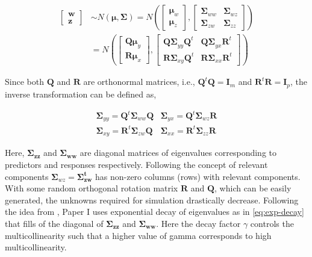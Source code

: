 \documentclass[11pt,twoside,openright,titlepage,
  headinclude,footinclude,BCOR=5mm,
  numbers=noenddot,cleardoublepage=empty,
  tablecaptionabove, dottedtoc,
  bibliography=totoc,paper=a4]{scrreprt}
\begin{document}
\begin{align}
  \begin{bmatrix}\mathbf{w} \\
  \mathbf{z}\end{bmatrix}  & \sim N \left(\boldsymbol{\mu}, \boldsymbol{\Sigma}\right)
  = N \left(
    \begin{bmatrix}
      \boldsymbol{\mu}_w \\ \boldsymbol{\mu}_z
    \end{bmatrix},
    \begin{bmatrix}
      \boldsymbol{\Sigma}_{ww} & \boldsymbol{\Sigma}_{wz} \\
      \boldsymbol{\Sigma}_{zw} & \boldsymbol{\Sigma}_{zz}
    \end{bmatrix} \right) \nonumber \\
  &= N \left(
    \begin{bmatrix}
      \boldsymbol{Q\mu}_y \\
      \boldsymbol{R\mu}_x
    \end{bmatrix},
    \begin{bmatrix}
      \boldsymbol{Q\Sigma}_{yy}\boldsymbol{Q}^t & \boldsymbol{Q\Sigma}_{yx}\mathbf{R}^t \\
      \boldsymbol{R\Sigma}_{xy}\boldsymbol{Q}^t & \boldsymbol{R\Sigma}_{xx}\mathbf{R}^t
    \end{bmatrix}
  \right)
  \label{eq:latent-model}
\end{align}

Since both \(\mathbf{Q}\) and \(\mathbf{R}\) are orthonormal matrices, i.e., \(\mathbf{Q}^t\mathbf{Q} = \mathbf{I}_m\) and \(\mathbf{R}^t\mathbf{R} = \mathbf{I}_p\), the inverse transformation can be defined as,

\begin{equation}
  \begin{matrix}
    \boldsymbol{\Sigma}_{yy} = \mathbf{Q}^t \boldsymbol{\Sigma}_{ww} \mathbf{Q} &
    \boldsymbol{\Sigma}_{yx} = \mathbf{Q}^t \boldsymbol{\Sigma}_{wz} \mathbf{R} \\
    \boldsymbol{\Sigma}_{xy} = \mathbf{R}^t \boldsymbol{\Sigma}_{zw} \mathbf{Q} &
    \boldsymbol{\Sigma}_{xx} = \mathbf{R}^t \boldsymbol{\Sigma}_{zz} \mathbf{R}
  \end{matrix}
  \label{eq:cov-yx-wz}
\end{equation}

Here, \(\boldsymbol{\Sigma_{zz}}\) and \(\boldsymbol{\Sigma_{ww}}\) are diagonal matrices of eigenvalues corresponding to predictors and responses respectively. Following the concept of relevant components \(\boldsymbol{\Sigma}_{wz} = \boldsymbol{\Sigma_{zw}^t}\) has non-zero columns (rows) with relevant components. With some random orthogonal rotation matrix \(\mathbf{R}\) and \(\mathbf{Q}\), which can be easily generated, the unknowns required for simulation drastically decrease. Following the idea from \citet{saebo2015simrel}, Paper I uses exponential decay of eigenvalues as in \eqref{eq:exp-decay} that fills of the diagonal of \(\boldsymbol{\Sigma_{zz}}\) and \(\boldsymbol{\Sigma_{ww}}\). Here the decay factor \(\gamma\) controls the multicollinearity such that a higher value of gamma corresponds to high multicollinearity.
\end{document}
